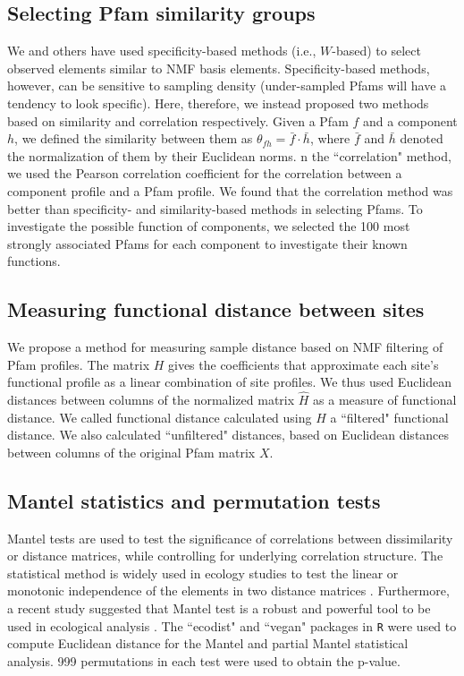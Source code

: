 \subsection{Selecting Pfam similarity groups}

We and others \cite{jiang_non-negative_2012, kim_sparse_2007} have used specificity-based methods (i.e., $W$-based) to select observed elements similar to NMF basis elements. Specificity-based methods, however, can be sensitive to sampling density (under-sampled Pfams will have a tendency to look specific). Here, therefore, we instead proposed two methods based on similarity and correlation respectively. Given a Pfam $f$ and a component $h$, we defined the similarity between them as $\theta_{fh} = \bar f \cdot \bar h$, where $\bar f$ and $\bar h$ denoted the normalization of them by their Euclidean norms.  n the ``correlation" method, we used the Pearson correlation coefficient for the correlation between a component profile and a Pfam profile. We found that the correlation method was better than specificity- and similarity-based methods in selecting Pfams. To investigate the possible function of components, we selected the 100 most strongly associated Pfams for each component to investigate their known functions. 

\subsection{Measuring functional distance between sites}

We propose a method for measuring sample distance based on NMF filtering of Pfam profiles. The matrix $H$ gives the coefficients that approximate each site's functional profile as a linear combination of site profiles.  We thus used Euclidean distances between columns of the normalized matrix $\hat H$ as a measure of functional distance. We called functional distance calculated using $H$ a ``filtered" functional distance.  We also calculated ``unfiltered" distances, based on Euclidean distances between columns of the original Pfam matrix $X$.

\subsection{Mantel statistics and permutation tests}

Mantel tests are used to test the significance of correlations between dissimilarity or distance matrices, while controlling for underlying correlation structure. The statistical method is widely used in ecology studies to test the linear or monotonic independence of the elements in two distance matrices \cite{martiny_microbial_2006, raes_toward_2011}. Furthermore, a recent study suggested that Mantel test is a robust and powerful tool to be used in ecological analysis \cite{borcard_is_2012}. The ``ecodist" and ``vegan" packages in {\tt R} were used to compute Euclidean distance for the Mantel and partial Mantel statistical analysis. 999 permutations in each test were used to obtain the p-value. 

